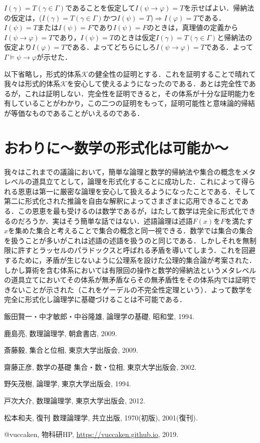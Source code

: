 \documentclass[10pt,b5paper,papersize,dvipdfmx]{jsbook}
\begin{document}
$I(\gamma)=T(\gamma \in \Gamma)$であることを仮定して$I(\psi \to \varphi)=T$を示せばよい．帰納法の仮定は，($I(\gamma)=T(\gamma \in \Gamma)$かつ$I(\psi)=T$)$\Rightarrow$$I(\varphi)=T$である．$I(\psi) = T$または$I(\psi) = F$であり$I(\psi) = F$のときは，真理値の定義から$I(\psi \to \varphi)=T$であり，$I(\psi) = T$のときは仮定$I(\gamma)=T(\gamma \in \Gamma)$と帰納法の仮定より$I(\varphi)=T$である．よってどちらにしろ$I(\psi \to \varphi)=T$である．よって$\Gamma \models \psi \to \varphi$が示せた．\par
以下省略し，形式的体系$\mathcal K$の健全性の証明とする．これを証明することで晴れて我々は形式的体系$\mathcal K$を安心して使えるようになったのである．あとは完全性であるが，これは証明しない．完全性を証明できると，その体系が十分な証明能力を有していることがわかり，この二つの証明をもって，証明可能性と意味論的帰結が等価なものであることがいえるのである．

\section{おわりに～数学の形式化は可能か～}
我々はこれまでの議論において，簡単な論理と数学的帰納法や集合の概念をメタレベルの道具立てとして，論理を形式化することに成功した．これによって得られる恩恵は第一に厳密な論理を安心して扱えるようになったことである．そして第二に形式化された推論を自由な解釈によってさまざまに応用できることである．この恩恵を最も受けるのは数学であるが，はたして数学は完全に形式化できるのだろうか．実はそう簡単な話ではない．述語論理は述語$F(x)$を$F$を満たす$x$を集めた集合と考えることで集合の概念と同一視できる．数学では集合の集合を扱うことが多いがこれは述語の述語を扱うのと同じである．しかしそれを無制限に許すとラッセルのパラドックスと呼ばれる矛盾を導いてしまう．これを回避するために，矛盾が生じないように公理系を設けた公理的集合論が考案された．しかし算術を含む体系においては有限回の操作と数学的帰納法というメタレベルの道具立てにおいてその体系が無矛盾ならその無矛盾性をその体系内では証明できないことが示された（これをゲーデルの不完全性定理という）．よって数学を完全に形式化し論理学に基礎づけることは不可能である．

\begin{thebibliography}{99}
  \item 飯田賢一・中才敏郎・中谷隆雄, 論理学の基礎, 昭和堂, 1994.
  \item 鹿島亮, 数理論理学, 朝倉書店, 2009.
  \item 斎藤毅, 集合と位相, 東京大学出版会, 2009.
  \item 齋藤正彦, 数学の基礎 集合・数・位相, 東京大学出版会, 2002.
  \item 野矢茂樹, 論理学, 東京大学出版会, 1994.
  \item 戸次大介, 数理論理学, 東京大学出版会, 2012.
  \item 松本和夫, 復刊 数理論理学, 共立出版, 1970(初版), 2001(復刊).
  \item @vuccaken, 物科研HP, \url{https://vuccaken.github.io}, 2019.
\end{thebibliography}
\end{document}
